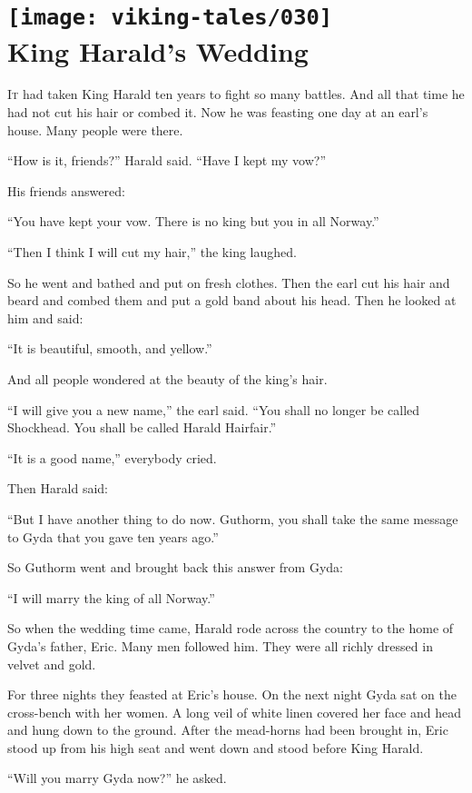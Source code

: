 \chapter[King Harald's Wedding]{
    \texttt{[image: viking-tales/030]}\\
    King Harald's Wedding}

\lettrine{I}{t} had taken King Harald ten years to fight so many battles.
And all that time he had not cut his hair or combed it. Now he was
feasting one day at an earl's house. Many people were there.

``How is it, friends?'' Harald said. ``Have I kept my vow?''

His friends answered:

``You have kept your vow. There is no king but you in all Norway.''

``Then I think I will cut my hair,'' the king laughed.

So he went and bathed and put on fresh clothes. Then the earl cut his
hair and beard and combed them and put a gold band about his head. Then
he looked at him and said:

``It is beautiful, smooth, and yellow.''

And all people wondered at the beauty of the king's hair.

``I will give you a new name,'' the earl said. ``You shall no longer be
called Shockhead. You shall be called Harald Hairfair.''

``It is a good name,'' everybody cried.

Then Harald said:

``But I have another thing to do now. Guthorm, you shall take the same
message to Gyda that you gave ten years ago.''

So Guthorm went and brought back this answer from Gyda:

``I will marry the king of all Norway.''

So when the wedding time came, Harald rode across the country to the
home of Gyda's father, Eric. Many men followed him. They were all richly
dressed in velvet and gold.

For three nights they feasted at Eric's house. On the next night Gyda
sat on the cross-bench with her women. A long veil of white linen
covered her face and head and hung down to the ground. After the
mead-horns had been brought in, Eric stood up from his high seat and
went down and stood before King Harald.

``Will you marry Gyda now?'' he asked.

